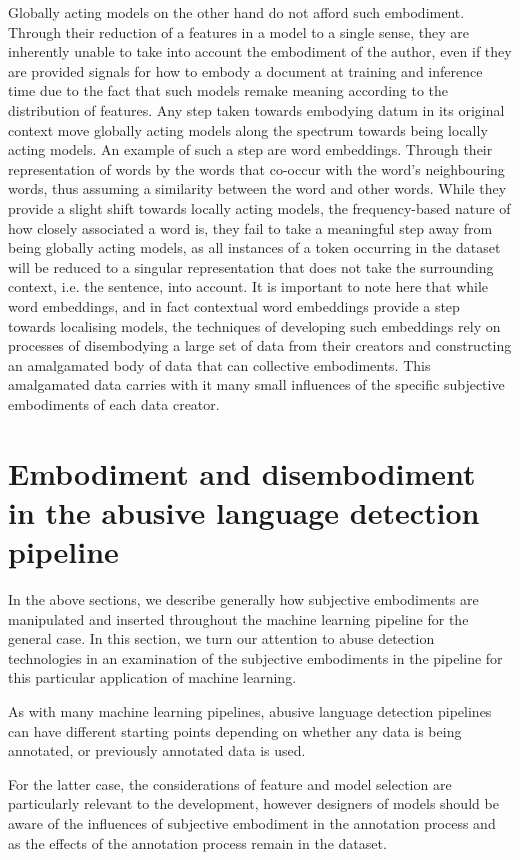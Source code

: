 Globally acting models on the other hand do not afford such embodiment. Through their reduction of a features in a model to a single sense, they are inherently unable to take into account the embodiment of the author, even if they are provided signals for how to embody a document at training and inference time due to the fact that such models remake meaning according to the distribution of features. Any step taken towards embodying datum in its original context move globally acting models along the spectrum towards being locally acting models. An example of such a step are word embeddings. Through their representation of words by the words that co-occur with the word's neighbouring words, thus assuming a similarity between the word and other words. While they provide a slight shift towards locally acting models, the frequency-based nature of how closely associated a word is, they fail to take a meaningful step away from being globally acting models, as all instances of a token occurring in the dataset will be reduced to a singular representation that does not take the surrounding context, i.e. the sentence, into account.
It is important to note here that while word embeddings, and in fact contextual word embeddings provide a step towards localising models, the techniques of developing such embeddings rely on processes of disembodying a large set of data from their creators and constructing an amalgamated body of data that can collective embodiments. This amalgamated data carries with it many small influences of the specific subjective embodiments of each data creator.

\section{Embodiment and disembodiment in the abusive language detection pipeline}
In the above sections, we describe generally how subjective embodiments are manipulated and inserted throughout the machine learning pipeline for the general case. In this section, we turn our attention to abuse detection technologies in an examination of the subjective embodiments in the pipeline for this particular application of machine learning.\vspace{5mm}

As with many machine learning pipelines, abusive language detection pipelines can have different starting points depending on whether any data is being annotated, or previously annotated data is used.

For the latter case, the considerations of feature and model selection  are particularly relevant to the development, however designers of models should be aware of the influences of subjective embodiment in the annotation process and as the effects of the annotation process remain in the dataset.\vspace{5mm}

